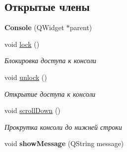 \subsection*{Открытые члены}
\begin{DoxyCompactItemize}
\item 
{\bfseries Console} (Q\+Widget $\ast$parent)\hypertarget{class_console_a51a9f808630af055a1ae544cc0b71a79}{}\label{class_console_a51a9f808630af055a1ae544cc0b71a79}

\item 
void \hyperlink{class_console_a8de0b9cb5c35e5d30229b74052d188af}{lock} ()\hypertarget{class_console_a8de0b9cb5c35e5d30229b74052d188af}{}\label{class_console_a8de0b9cb5c35e5d30229b74052d188af}

\begin{DoxyCompactList}\small\item\em Блокировка доступа к консоли \end{DoxyCompactList}\item 
void \hyperlink{class_console_aac16437e3bb91f08b4ea111db6984a4a}{unlock} ()\hypertarget{class_console_aac16437e3bb91f08b4ea111db6984a4a}{}\label{class_console_aac16437e3bb91f08b4ea111db6984a4a}

\begin{DoxyCompactList}\small\item\em Открытие доступа к консоли \end{DoxyCompactList}\item 
void \hyperlink{class_console_ab5a3fbea2f7f738e87643a9a3ee8dfed}{scroll\+Down} ()\hypertarget{class_console_ab5a3fbea2f7f738e87643a9a3ee8dfed}{}\label{class_console_ab5a3fbea2f7f738e87643a9a3ee8dfed}

\begin{DoxyCompactList}\small\item\em Прокрутка консоли до нижней строки \end{DoxyCompactList}\item 
void {\bfseries show\+Message} (Q\+String message)\hypertarget{class_console_a3771d521ac2e15b1d8750d0a2204559c}{}\label{class_console_a3771d521ac2e15b1d8750d0a2204559c}

\end{DoxyCompactItemize}
